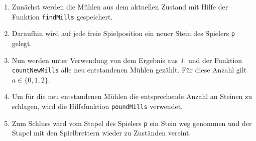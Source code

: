 \documentclass[11pt]{article}
\providecommand{\tightlist}{%
      \setlength{\itemsep}{0pt}\setlength{\parskip}{0pt}}
\begin{document}
\begin{enumerate}
\def\labelenumi{\arabic{enumi}.}
\tightlist
\item
  Zunächst werden die Mühlen aus dem aktuellen Zustand mit Hilfe der
  Funktion \texttt{findMills} gespeichert.
\item
  Daraufhin wird auf jede freie Spielposition ein neuer Stein des
  Spielers \texttt{p} gelegt.
\item
  Nun werden unter Verwendung von dem Ergebnis aus \emph{1.} und der
  Funktion \texttt{countNewMills} alle neu entstandenen Mühlen gezählt.
  Für diese Anzahl gilt \(a \in \{0,1,2\}\).
\item
  Um für die neu entstandenen Mühlen die entsprechende Anzahl an Steinen
  zu schlagen, wird die Hilfsfunktion \texttt{poundMills} verwendet.
\item
  Zum Schluss wird vom Stapel des Spielers \texttt{p} ein Stein weg
  genommen und der Stapel mit den Spielbrettern wieder zu Zuständen
  vereint.
\end{enumerate}
\end{document}
